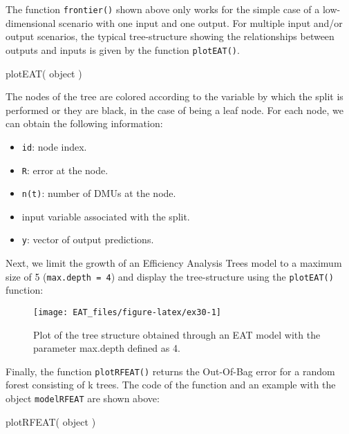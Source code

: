 The function \texttt{frontier()} shown above only works for the simple
case of a low-dimensional scenario with one input and one output. For
multiple input and/or output scenarios, the typical tree-structure
showing the relationships between outputs and inputs is given by the
function \texttt{plotEAT()}.

\begin{Schunk}
\begin{Sinput}
plotEAT(
  object
)
\end{Sinput}
\end{Schunk}

The nodes of the tree are colored according to the variable by which the
split is performed or they are black, in the case of being a leaf node.
For each node, we can obtain the following information:

\begin{itemize}
\item
  \texttt{id}: node index.
\item
  \texttt{R}: error at the node.
\item
  \texttt{n(t)}: number of DMUs at the node.
\item
  input variable associated with the split.
\item
  \texttt{y}: vector of output predictions.
\end{itemize}

Next, we limit the growth of an Efficiency Analysis Trees model to a
maximum size of 5 (\texttt{max.depth\ =\ 4}) and display the
tree-structure using the \texttt{plotEAT()} function:

\begin{Schunk}
\begin{figure}

{\centering \texttt{[image: EAT\_files/figure-latex/ex30-1]} 

}

\caption[Plot of the tree structure obtained through an EAT model with the parameter max.depth defined as 4]{Plot of the tree structure obtained through an EAT model with the parameter max.depth defined as 4.}\label{fig:ex30}
\end{figure}
\end{Schunk}

Finally, the function \texttt{plotRFEAT()} returns the Out-Of-Bag error
for a random forest consisting of k trees. The code of the function and
an example with the object \texttt{modelRFEAT} are shown above:

\begin{Schunk}
\begin{Sinput}
plotRFEAT(
  object
)
\end{Sinput}
\end{Schunk}

